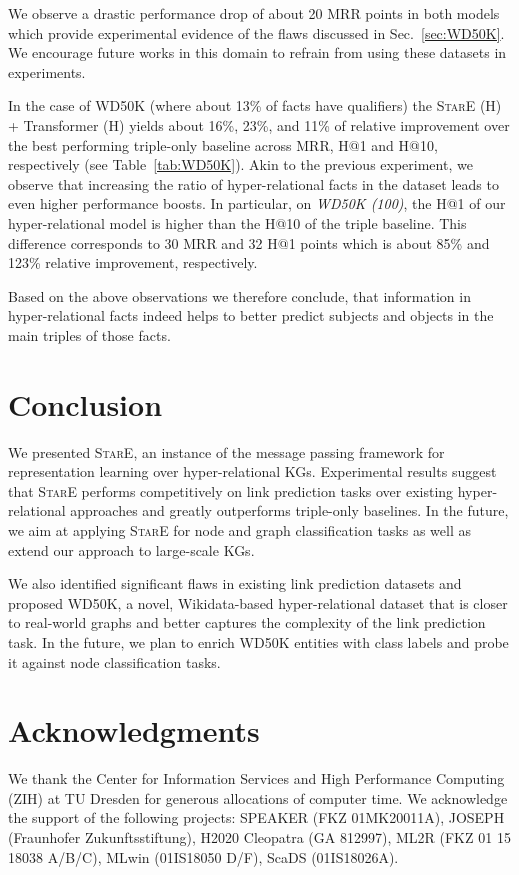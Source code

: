 \documentclass[11pt,a4paper]{article}
\begin{document}
We observe a drastic performance drop of about 20 MRR points in both models which provide experimental evidence of the flaws discussed in Sec.~\ref{sec:WD50K}. 
We encourage future works in this domain to refrain from using these datasets in experiments.

    

In the case of WD50K (where about 13\% of facts have qualifiers) the \textsc{StarE} (H) + Transformer (H) yields about 16\%, 23\%, and 11\% of relative improvement over the best performing triple-only baseline across MRR, H@1 and H@10, respectively (see Table~\ref{tab:WD50K}). Akin to the previous experiment, we observe that increasing the ratio of hyper-relational facts in the dataset leads to even higher performance boosts. 
In particular, on \emph{WD50K (100)}, the H@1 of our hyper-relational model is higher than the H@10 of the triple baseline.
This difference corresponds to 30 MRR and 32 H@1 points which is about 85\% and 123\% relative improvement, respectively.


Based on the above observations we therefore conclude, that information in hyper-relational facts indeed helps to better predict subjects and objects in the main triples of those facts.

\section{Conclusion}

We presented \textsc{StarE}, an instance of the message passing framework for representation learning over hyper-relational KGs. 
Experimental results suggest that \textsc{StarE} performs competitively on link prediction tasks over existing hyper-relational approaches and greatly outperforms triple-only baselines. 
In the future, we aim at applying \textsc{StarE} for node and graph classification tasks as well as extend our approach to large-scale KGs.


We also identified significant flaws in existing link prediction datasets and proposed WD50K, a novel, Wikidata-based hyper-relational dataset that is closer to real-world graphs and better captures the complexity of the link prediction task.  In the future, we plan to enrich WD50K entities with class labels and probe it against node classification tasks.





\section*{Acknowledgments}
We thank the Center for Information Services and High Performance Computing (ZIH) at TU Dresden for generous allocations of computer time. We acknowledge the support of the following projects: SPEAKER (FKZ 01MK20011A), JOSEPH (Fraunhofer Zukunftsstiftung), H2020 Cleopatra (GA 812997), ML2R (FKZ 01 15 18038 A/B/C), MLwin (01IS18050 D/F), ScaDS (01IS18026A).
\end{document}
